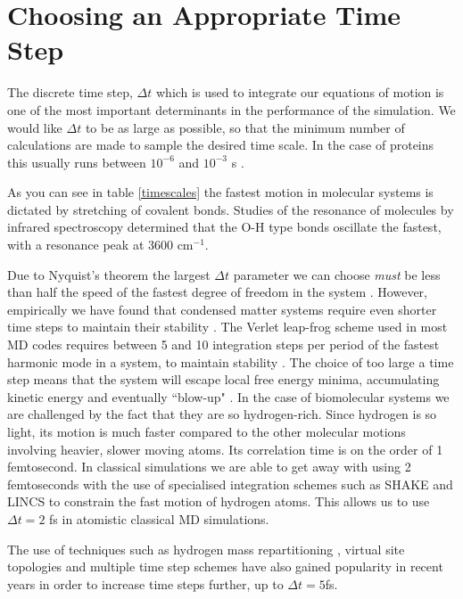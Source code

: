 \section{Choosing an Appropriate Time Step}
The discrete time step, $\Delta t$ which is used to integrate our equations of motion is one of the most important determinants in the performance of the simulation. We would like $\Delta t$ to be as large as possible, so that the minimum number of calculations are made to sample the desired time scale. In the case of proteins this usually runs between $10^{-6}$ and $10^{-3}$ s \cite{robustelli2022}.  

As you can see in table \ref{timescales} the fastest motion in molecular systems is dictated by stretching of covalent bonds. Studies of the resonance of molecules by infrared spectroscopy determined that the O-H type bonds oscillate the fastest, with a resonance peak at 3600 cm$^{-1}$\cite{schlick2010}. 

Due to Nyquist's theorem the largest $\Delta t$ parameter we can choose \textit{must} be less than half the speed of the fastest degree of freedom in the system \cite{shannon1949}. However, empirically we have found that condensed matter systems require even shorter time steps to maintain their stability \cite{leach2001}. The Verlet leap-frog scheme used in most MD codes requires between 5 and 10 integration steps per period of the fastest harmonic mode in a system, to maintain stability \cite{mazur1997, feenstra1999}. The choice of too large a time step means that the system will escape local free energy minima, accumulating kinetic energy and eventually ``blow-up" \cite{braun2019}. In the case of biomolecular systems we are challenged by the fact that they are so hydrogen-rich. Since hydrogen is so light, its motion is much faster compared to the other molecular motions involving heavier, slower moving atoms. Its correlation time is on the order of 1 femtosecond. In classical simulations we are able to get away with using 2 femtoseconds with the use of specialised integration schemes such as SHAKE\cite{andersen1983} and LINCS\cite{hess1997} to constrain the fast motion of hydrogen atoms. This allows us to use $\Delta t = 2$ fs in atomistic classical MD simulations.

The use of techniques such as hydrogen mass repartitioning \cite{balusek2019}, virtual site topologies \cite{feenstra1999} and multiple time step schemes \cite{streett1978} have also gained popularity in recent years in order to increase time steps further, up to $\Delta t = 5 $fs. 

